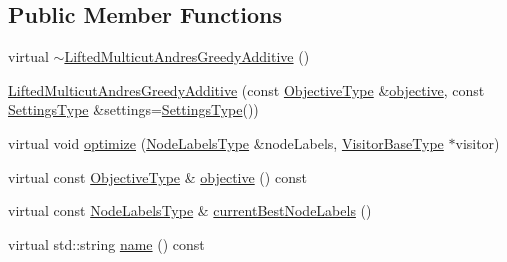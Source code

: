 \subsection*{Public Member Functions}
\begin{DoxyCompactItemize}
\item 
virtual \hyperlink{classnifty_1_1graph_1_1opt_1_1lifted__multicut_1_1LiftedMulticutAndresGreedyAdditive_a800c1d72765f6fdb8d77e514be5254f9}{$\sim$\+Lifted\+Multicut\+Andres\+Greedy\+Additive} ()
\item 
\hyperlink{classnifty_1_1graph_1_1opt_1_1lifted__multicut_1_1LiftedMulticutAndresGreedyAdditive_a268943838f99a6d6505172013b934e29}{Lifted\+Multicut\+Andres\+Greedy\+Additive} (const \hyperlink{classnifty_1_1graph_1_1opt_1_1lifted__multicut_1_1LiftedMulticutAndresGreedyAdditive_a17071365067415acd658d848f37f361a}{Objective\+Type} \&\hyperlink{classnifty_1_1graph_1_1opt_1_1lifted__multicut_1_1LiftedMulticutAndresGreedyAdditive_af11f4a1d5d7f4897918733ba648c72a2}{objective}, const \hyperlink{structnifty_1_1graph_1_1opt_1_1lifted__multicut_1_1LiftedMulticutAndresGreedyAdditive_1_1SettingsType}{Settings\+Type} \&settings=\hyperlink{structnifty_1_1graph_1_1opt_1_1lifted__multicut_1_1LiftedMulticutAndresGreedyAdditive_1_1SettingsType}{Settings\+Type}())
\item 
virtual void \hyperlink{classnifty_1_1graph_1_1opt_1_1lifted__multicut_1_1LiftedMulticutAndresGreedyAdditive_abc3c421d253fb7b1ed888f3462269f02}{optimize} (\hyperlink{classnifty_1_1graph_1_1opt_1_1lifted__multicut_1_1LiftedMulticutAndresGreedyAdditive_ae5dcc77ffcf6364667033052f43327e8}{Node\+Labels\+Type} \&node\+Labels, \hyperlink{classnifty_1_1graph_1_1opt_1_1lifted__multicut_1_1LiftedMulticutAndresGreedyAdditive_aaec5054a53fdbf048b7e2b63959db03e}{Visitor\+Base\+Type} $\ast$visitor)
\item 
virtual const \hyperlink{classnifty_1_1graph_1_1opt_1_1lifted__multicut_1_1LiftedMulticutAndresGreedyAdditive_a17071365067415acd658d848f37f361a}{Objective\+Type} \& \hyperlink{classnifty_1_1graph_1_1opt_1_1lifted__multicut_1_1LiftedMulticutAndresGreedyAdditive_af11f4a1d5d7f4897918733ba648c72a2}{objective} () const
\item 
virtual const \hyperlink{classnifty_1_1graph_1_1opt_1_1lifted__multicut_1_1LiftedMulticutAndresGreedyAdditive_ae5dcc77ffcf6364667033052f43327e8}{Node\+Labels\+Type} \& \hyperlink{classnifty_1_1graph_1_1opt_1_1lifted__multicut_1_1LiftedMulticutAndresGreedyAdditive_aeada6b7d38bc3309ee96048bd41dc039}{current\+Best\+Node\+Labels} ()
\item 
virtual std\+::string \hyperlink{classnifty_1_1graph_1_1opt_1_1lifted__multicut_1_1LiftedMulticutAndresGreedyAdditive_a4ab9f84d8b762a10f8f31f5dc5721e70}{name} () const
\end{DoxyCompactItemize}


